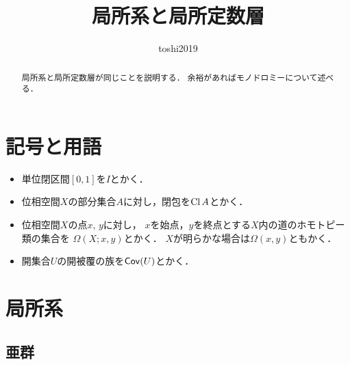 
\def\inner<#1>{\langle #1 \rangle}








\title{局所系と局所定数層}
\author{toshi2019}
\date{}

\maketitle

\begin{abstract}
    局所系と局所定数層が同じことを説明する．
    余裕があればモノドロミーについて述べる．
\end{abstract}
\section*{記号と用語}
\begin{itemize}
    \item 単位閉区間\([0,1]\)を\(I\)とかく．
    \item 位相空間\(X\)の部分集合\(A\)に対し，閉包を\(\mathop{\mathrm{Cl}}\nolimits{A}\)とかく．
    \item 位相空間\(X\)の点\(x\), \(y\)に対し，
    \(x\)を始点，\(y\)を終点とする\(X\)内の道のホモトピー類の集合を
    \(\varOmega(X;x,y)\)とかく．
    \(X\)が明らかな場合は\(\varOmega(x,y)\)ともかく．
    \item 開集合\(U\)の開被覆の族を\(\mathop{\mathsf{Cov}}\nolimits(U)\)とかく．
\end{itemize}



\section{局所系}

\subsection{亜群}


